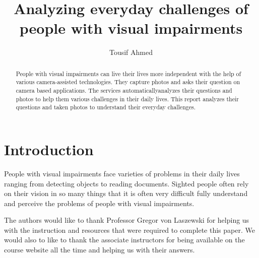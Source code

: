 \documentclass[sigconf]{acmart}
\begin{document}
\title{Analyzing everyday challenges of people with visual impairments}


\author{Tousif Ahmed}



\begin{abstract}People with visual impairments can live their lives more independent
       with the help of various camera-assisted technologies. They capture
       photos and asks their question on camera based applications.
       The services automaticallyanalyzes their questions and photos
       to help them various challenges in their daily lives.
       This report analyzes their questions and taken photos
       to understand their everyday challenges.

\end{abstract}



\maketitle





\section{Introduction}
People with visual impairments face varieties of problems in their daily lives ranging from detecting objects to reading documents. Sighted people often rely on their vision in so many things that it is often very difficult fully understand and perceive the problems of people with visual impairments.  





\begin{acks}

The authors would like to thank Professor Gregor von Laszewski for helping us with the instruction and resources that were required to complete this paper. We would also to like to thank the associate instructors for being available on the course website all the time and helping us with their answers.

\end{acks}
\end{document}
